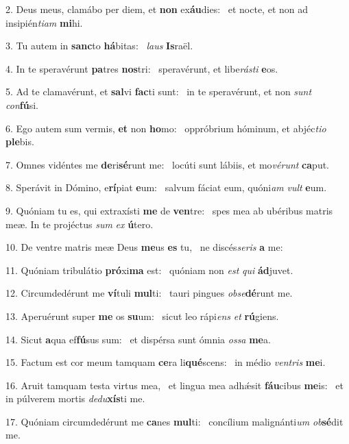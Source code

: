 2. Deus meus, clamábo per diem, et \textbf{non} ex\textbf{áu}dies: \ast\  et nocte, et non ad insipién\textit{ti}\textit{am} \textbf{mi}hi.\

3. Tu autem in \textbf{sanc}to \textbf{há}bitas: \ast\  \textit{laus} \textbf{Is}raël.\

4. In te speravérunt \textbf{pa}tres \textbf{nos}tri: \ast\  speravérunt, et libe\textit{rás}\textit{ti} \textbf{e}os.\

5. Ad te clamavérunt, et \textbf{sal}vi \textbf{fac}ti sunt: \ast\  in te speravérunt, et non \textit{sunt} \textit{con}\textbf{fú}si.\

6. Ego autem sum vermis, \textbf{et} non \textbf{ho}mo: \ast\  oppróbrium hóminum, et abjéc\textit{ti}\textit{o} \textbf{ple}bis.\

7. Omnes vidéntes me \textbf{de}ri\textbf{sé}runt me: \ast\  locúti sunt lábiis, et mo\textit{vé}\textit{runt} \textbf{ca}put.\

8. Sperávit in Dómino, e\textbf{rí}piat \textbf{e}um: \ast\  salvum fáciat eum, quóni\textit{am} \textit{vult} \textbf{e}um.\

9. Quóniam tu es, qui extraxísti \textbf{me} de \textbf{ven}tre: \ast\  spes mea ab ubéribus matris meæ. In te projéctus \textit{sum} \textit{ex} \textbf{ú}tero.\

10. De ventre matris meæ Deus \textbf{me}us \textbf{es} tu, \ast\  ne discés\textit{se}\textit{ris} \textbf{a} me:\

11. Quóniam tribulátio \textbf{pró}xi\textbf{ma} est: \ast\  quóniam non \textit{est} \textit{qui} \textbf{ád}juvet.\

12. Circumdedérunt me \textbf{ví}tuli \textbf{mul}ti: \ast\  tauri pingues \textit{ob}\textit{se}\textbf{dé}runt me.\

13. Aperuérunt super \textbf{me} os \textbf{su}um: \ast\  sicut leo rápi\textit{ens} \textit{et} \textbf{rú}giens.\

14. Sicut \textbf{a}qua ef\textbf{fú}sus sum: \ast\  et dispérsa sunt ómnia \textit{os}\textit{sa} \textbf{me}a.\

15. Factum est cor meum tamquam \textbf{ce}ra li\textbf{qué}scens: \ast\  in médio \textit{ven}\textit{tris} \textbf{me}i.\

16. Aruit tamquam testa virtus mea, \dag\  et lingua mea adhǽsit \textbf{fáu}cibus \textbf{me}is: \ast\  et in púlverem mortis \textit{de}\textit{du}\textbf{xís}ti me.\

17. Quóniam circumdedérunt me \textbf{ca}nes \textbf{mul}ti: \ast\  concílium malignánti\textit{um} \textit{ob}\textbf{sé}dit me.\

